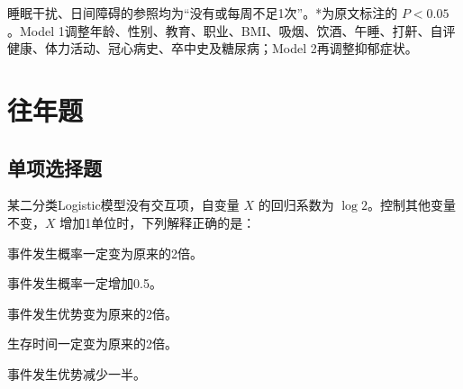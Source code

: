 \begin{minipage}{\linewidth}
睡眠干扰、日间障碍的参照均为``没有或每周不足1次''。*为原文标注的 \(P<0.05\)。Model 1调整年龄、性别、教育、职业、BMI、吸烟、饮酒、午睡、打鼾、自评健康、体力活动、冠心病史、卒中史及糖尿病；Model 2再调整抑郁症状。



\end{minipage}\par\vspace{5pt}

\par\addvspace{8pt}\noindent\begin{minipage}{\linewidth}

\section{往年题}

\subsection{单项选择题}


某二分类Logistic模型没有交互项，自变量 \(X\) 的回归系数为 \(\log 2\)。控制其他变量不变，\(X\) 增加1单位时，下列解释正确的是：


\begin{choices}

\item 事件发生概率一定变为原来的2倍。

\item 事件发生概率一定增加0.5。

\item 事件发生优势变为原来的2倍。

\item 生存时间一定变为原来的2倍。

\item 事件发生优势减少一半。

\end{choices}

\end{minipage}\par\vspace{5pt}

